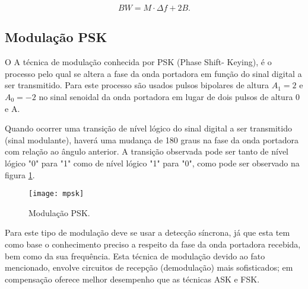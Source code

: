 \[
BW = M\cdot \Delta f +2B.
\]

\subsection{Modulação PSK}

O A técnica de modulação conhecida por PSK (Phase Shift- Keying), é o processo pelo qual se altera a fase da onda portadora em função do sinal digital a ser transmitido. Para este processo são usados pulsos bipolares de altura $A_1 = 2$ e $A_0 = -2$ no sinal senoidal da onda portadora em lugar de dois pulsos de altura 0 e A.

Quando ocorrer uma transição de nível lógico do sinal digital a ser transmitido (sinal modulante), haverá uma mudança de 180 graus na fase da onda portadora com relação ao ângulo anterior. A transição observada pode ser tanto de nível lógico "0" para "1" como de nível lógico "1" para "0", como pode ser observado na figura \ref{fig:mpsk}. 

\begin{figure}[H]
    \centering
    \texttt{[image: mpsk]}
    \caption{Modulação PSK.}
    \label{fig:mpsk}
\end{figure}

Para este tipo de modulação deve se usar a detecção síncrona, já que esta tem como base o conhecimento preciso a respeito da fase da onda portadora recebida, bem como da sua frequência.
Esta técnica de modulação devido ao fato mencionado, envolve circuitos de recepção (demodulação) mais sofisticados; em compensação oferece melhor desempenho que as técnicas ASK e FSK.